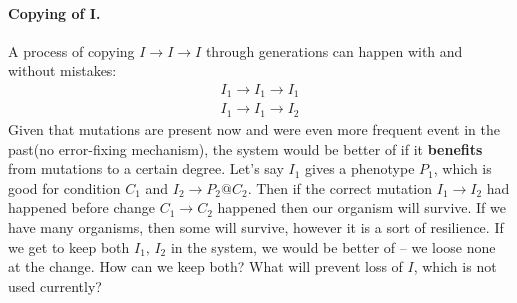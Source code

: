 \documentclass[12pt]{paper}
\begin{document}
\paragraph{Copying of I.} A process of copying $I\to I \to I$ through generations can happen with 
and without mistakes:
\begin{eqnarray}
  I_1\to I_1 \to I_1\\
  I_1\to I_1 \to I_2
\end{eqnarray}
Given that mutations are present now and were even more frequent event in the past(no 
error-fixing mechanism), the system would be better of if it \textbf{benefits} from mutations to a 
certain degree. Let's say $I_1$ gives a phenotype $P_1$, which is good for condition $C_1$ and 
$I_2\to P_2@C_2$. Then if the correct mutation $I_1\to I_2$ had happened before change $C_1\to 
C_2$ happened then our organism will survive. If we have many organisms, then some will survive, 
however it is a sort of resilience. If we get to keep both $I_1,\,I_2$ in the system, we would be 
better of -- we loose none at the change. How can we keep both? What will prevent loss of $I$, 
which is not used currently?





\end{document}
